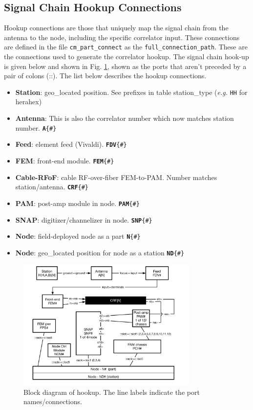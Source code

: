 \documentclass{article}
\begin{document}
\subsection{Signal Chain Hookup Connections}
Hookup connections are those that uniquely map the signal chain from the antenna to the node, including the specific correlator input.  These connections are defined in the file {\tt cm\_part\_connect} as the {\tt full\_connection\_path}.  These are the connections used to generate the correlator hookup.
The signal chain hook-up is given below and shown in Fig. \ref{fig:hookup}, shown as the ports that aren't preceded by a pair of colons (::).  The list below describes the hookup connections.
\begin{itemize}\setlength\itemsep{-.3em}
	\item {\bf Station}: geo\_located position.  See prefixes in table station\_type ({\em e.g.} {\tt HH} for herahex)
	\item {\bf Antenna}:  This is also the correlator number which now matches station number.  {\tt{\bf A}\{\#\}}
	\item {\bf Feed}:  element feed (Vivaldi).  {\tt {\bf FDV}\{\#\}}
	\item {\bf FEM}:  front-end module. {\tt {\bf FEM}\{\#\}}
	\item {\bf Cable-RFoF}:  cable RF-over-fiber FEM-to-PAM.  Number matches station/antenna. {\tt {\bf CRF}\{\#\}}
	\item {\bf PAM}:  post-amp module in node. {\tt {\bf PAM}\{\#\}}
	\item {\bf SNAP}:  digitizer/channelizer in node. {\tt {\bf SNP}\{\#\}}
	\item {\bf Node}: field-deployed node as a part {\tt {\bf N}\{\#\}}
	\item {\bf Node}:  geo\_located position for node as a station {\tt {\bf ND}\{\#\}}
\end{itemize}

\begin{figure}[H]
\includegraphics[width=0.8\textwidth]{hookup.pdf}
\centering
\caption{Block diagram of hookup.  The line labels indicate the port names/connections.}
\label{fig:hookup}
\end{figure}
\end{document}
